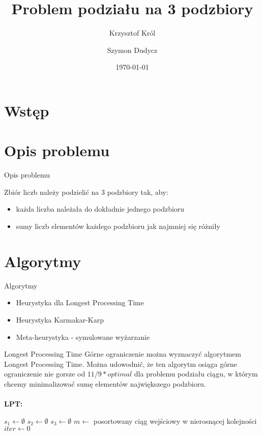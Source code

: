 \documentclass{beamer}
\title{Problem podziału na 3 podzbiory}
\author{
       Krzysztof Król\and
                Szymon Dudycz
}
\date{\today}
\begin{document}
\section{Wstęp}
\begin{frame}
  \titlepage
\end{frame}


\section{Opis problemu}

\begin{frame}{Opis problemu}

Zbiór liczb należy podzielić na 3 podzbiory tak, aby:
\begin{itemize}  
\item każda liczba należała do dokładnie jednego podzbioru
\item sumy liczb elementów każdego podzbioru jak najmniej się różniły
\end{itemize}

\end{frame}  

\section{Algorytmy}

\begin{frame}{Algorytmy}
\begin{itemize}
\item Heurystyka dla Longest Processing Time
\item Heurystyka Karmakar-Karp
\item Meta-heurystyka - symulowane wyżarzanie
\end{itemize}
\end{frame}

\begin{frame}{Longest Processing Time}
Górne ograniczenie można wyznaczyć algorytmem Longest Processing Time. Można udowodnić, że ten algorytm osiąga górne ograniczenie nie gorsze od $11/9*optimal$ dla problemu podziału ciągu, w którym chcemy minimalizować sumę elementów największego podzbioru.\\~\\
\textbf{LPT:}\\
\begin{algorithm}[H]
 $s_1 \gets \emptyset$\;
 $s_2 \gets \emptyset$\;
 $s_3 \gets \emptyset$\;
 $m \gets $ posortowany ciąg wejściowy w nierosnącej kolejności\;
 $iter \gets 0$\;
\end{algorithm} 
\end{frame}
\end{document}
